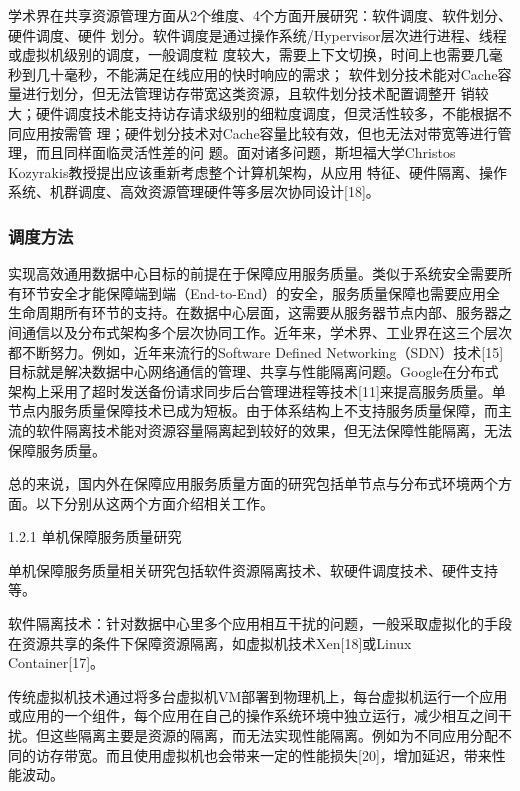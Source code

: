 学术界在共享资源管理方面从2个维度、4个方面开展研究：软件调度、软件划分、硬件调度、硬件
划分。软件调度是通过操作系统/Hypervisor层次进行进程、线程或虚拟机级别的调度，一般调度粒
度较大，需要上下文切换，时间上也需要几毫秒到几十毫秒，不能满足在线应用的快时响应的需求；
软件划分技术能对Cache容量进行划分，但无法管理访存带宽这类资源，且软件划分技术配置调整开
销较大；硬件调度技术能支持访存请求级别的细粒度调度，但灵活性较多，不能根据不同应用按需管
理；硬件划分技术对Cache容量比较有效，但也无法对带宽等进行管理，而且同样面临灵活性差的问
题。面对诸多问题，斯坦福大学Christos Kozyrakis教授提出应该重新考虑整个计算机架构，从应用
特征、硬件隔离、操作系统、机群调度、高效资源管理硬件等多层次协同设计[18]。

\subsubsection*{调度方法}
\label{sec:other}

实现高效通用数据中心目标的前提在于保障应用服务质量。类似于系统安全需要所有环节安全才能保障端到端（End-to-End）的安全，服务质量保障也需要应用全生命周期所有环节的支持。在数据中心层面，这需要从服务器节点内部、服务器之间通信以及分布式架构多个层次协同工作。近年来，学术界、工业界在这三个层次都不断努力。例如，近年来流行的Software Defined Networking（SDN）技术[15]目标就是解决数据中心网络通信的管理、共享与性能隔离问题。Google在分布式架构上采用了超时发送备份请求同步后台管理进程等技术[11]来提高服务质量。单节点内服务质量保障技术已成为短板。由于体系结构上不支持服务质量保障，而主流的软件隔离技术能对资源容量隔离起到较好的效果，但无法保障性能隔离，无法保障服务质量。

总的来说，国内外在保障应用服务质量方面的研究包括单节点与分布式环境两个方面。以下分别从这两个方面介绍相关工作。

1.2.1 单机保障服务质量研究

单机保障服务质量相关研究包括软件资源隔离技术、软硬件调度技术、硬件支持等。

软件隔离技术：针对数据中心里多个应用相互干扰的问题，一般采取虚拟化的手段在资源共享的条件下保障资源隔离，如虚拟机技术Xen[18]或Linux Container[17]。

传统虚拟机技术通过将多台虚拟机VM部署到物理机上，每台虚拟机运行一个应用或应用的一个组件，每个应用在自己的操作系统环境中独立运行，减少相互之间干扰。但这些隔离主要是资源的隔离，而无法实现性能隔离。例如为不同应用分配不同的访存带宽。而且使用虚拟机也会带来一定的性能损失[20]，增加延迟，带来性能波动。

